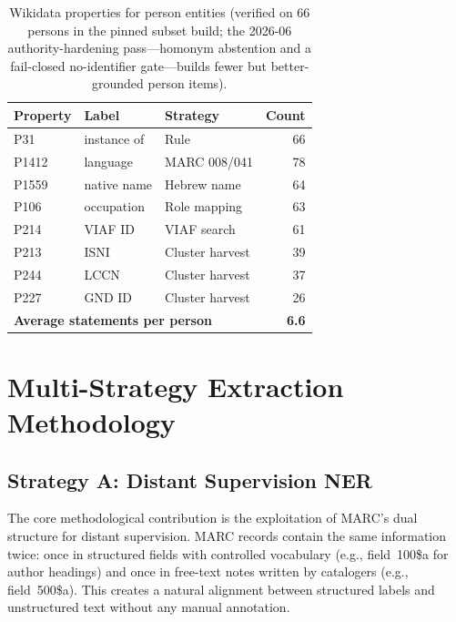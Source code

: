 \documentclass[Afour,sageh,times]{sagej}
\begin{document}
\begin{table}[t]
\caption{Wikidata properties for person entities (verified on 66 persons in the pinned subset build; the 2026-06 authority-hardening pass---homonym abstention and a fail-closed no-identifier gate---builds fewer but better-grounded person items).}
\label{tab:person-props}
\centering
\small
\begin{tabular}{lllr}
\toprule
\textbf{Property} & \textbf{Label} & \textbf{Strategy} & \textbf{Count} \\
\midrule
P31   & instance of    & Rule            & 66 \\
P1412 & language       & MARC 008/041    & 78 \\
P1559 & native name    & Hebrew name     & 64 \\
P106  & occupation     & Role mapping    & 63 \\
P214  & VIAF ID        & VIAF search     & 61 \\
P213  & ISNI           & Cluster harvest & 39 \\
P244  & LCCN           & Cluster harvest & 37 \\
P227  & GND ID         & Cluster harvest & 26  \\
\midrule
\multicolumn{3}{l}{\textbf{Average statements per person}} & \textbf{6.6} \\
\bottomrule
\end{tabular}
\end{table}


\section{Multi-Strategy Extraction Methodology}
\label{sec:methodology}

\subsection{Strategy A: Distant Supervision NER}
\label{sec:distant-supervision}

The core methodological contribution is the exploitation of MARC's dual structure for distant supervision. MARC records contain the same information twice: once in structured fields with controlled vocabulary (e.g., field~100\$a for author headings) and once in free-text notes written by catalogers (e.g., field~500\$a). This creates a natural alignment between structured labels and unstructured text without any manual annotation.
\end{document}
